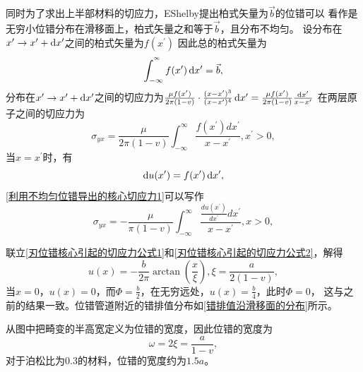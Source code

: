                 同时为了求出上半部材料的切应力，EShelby提出柏式矢量为$\vec{b}$的位错可以
                看作是无穷小位错分布在滑移面上，柏式矢量之和等于$\vec{b}$，且分布不均匀。
                设分布在$x^{\prime}\to x^{\prime}+\mathop{}\!\mathrm{d} x^{\prime}$之间的柏式矢量为$f(x^{\prime})$
                因此总的柏式矢量为
                \begin{equation}
                    \int_{-\infty}^{^\infty}f(x^{\prime})\mathop{}\!\mathrm{d} x^{\prime}=\vec{b},
                \end{equation}
                分布在$x^{\prime}\to x^{\prime}+\mathop{}\!\mathrm{d} x^{\prime}$之间的切应力为$\frac{\mu f(x^\prime)}{2\pi(1-v)}\cdot\frac{(x-x^{\prime})^3}{(x-x^\prime)^4}\mathop{}\!\mathrm{d} x^{\prime}=\frac{\mu f(x^\prime)}{2\pi(1-v)}\frac{\mathop{}\!\mathrm{d} x^{\prime}}{x-x^{\prime}}$
                在两层原子之间的切应力为
                \begin{equation}
                    \sigma_{y x}=\frac{\mu}{2 \pi(1-v)} \int_{-\infty}^{\infty} \frac{f\left(x^{\prime}\right) d x^{\prime}}{x-x^{\prime}}, x^{\prime}>0\label{利用不均匀位错导出的核心切应力1},
                \end{equation}
                当$x=x^\prime$时，有
                \begin{equation}
                    \mathop{}\!\mathrm{d} u(x^\prime)=f(x^\prime)\mathop{}\!\mathrm{d} x^\prime,
                \end{equation}
                \autoref{利用不均匀位错导出的核心切应力1}可以写作
                \begin{equation}
                    \sigma_{y x}=-\frac{\mu}{\pi(1-v)} \int_{-\infty}^{\infty} \frac{\frac{d u\left(x^{\prime}\right)}{d x^{\prime}} d x^{\prime}}{x-x^{\prime}}, x>0\label{刃位错核心引起的切应力公式2},
                \end{equation}
                
                联立\autoref{刃位错核心引起的切应力公式1}和\autoref{刃位错核心引起的切应力公式2}，解得
                \begin{equation}
                    u(x)=-\frac{b}{2\pi}\arctan\left( \frac{x}{\xi} \right),\xi=\frac{a}{2(1-v)},
                \end{equation}
                当$x=0$，$u(x)=0$，而$\Phi=\frac{b}{2}$，在无穷远处，$u(x)=\frac{b}{4}$，此时$\Phi=0$，
                这与之前的结果一致。位错管道附近的错排值分布如\autoref{错排值沿滑移面的分布}所示。

                
                
                从图中把畸变的半高宽定义为位错的宽度，因此位错的宽度为
                \begin{equation}
                    \omega=2\xi=\frac{a}{1-v},
                \end{equation}
                对于泊松比为0.3的材料，位错的宽度约为$1.5a$。

